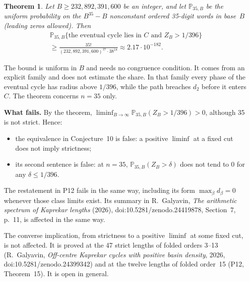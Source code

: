 \documentclass[11pt]{amsart}
\newtheorem*{theorem*}{Theorem}
\newcommand{\PP}{\mathbb{P}}
\begin{document}
\begin{theorem*}
Let \(B\ge 232{,}892{,}391{,}600\) be an integer, and let \(\PP_{35,B}\) be the uniform probability on the \(B^{35}-B\) nonconstant ordered 35-digit words in base~\(B\) (leading zeros allowed). Then
\begin{multline*}
\PP_{35,B}\{\text{the eventual cycle lies in }C\text{ and }Z_B>1/396\}\\
\ge\frac{35!}{(232{,}892{,}391{,}600)^{17}\cdot 38^{18}}\approx2.17\cdot10^{-182}.
\end{multline*}
\end{theorem*}

The bound is uniform in \(B\) and needs no congruence condition. It comes from an explicit family and does not estimate the share. In that family every phase of the eventual cycle has radius above \(1/396\), while the path breaches \(d_2\) before it enters \(C\). The theorem concerns \(n=35\) only.

\medskip\noindent\textbf{What fails.} By the theorem, \(\liminf_{B\to\infty}\PP_{35,B}(Z_B>1/396)>0\), although 35 is not strict. Hence:
\begin{itemize}
\item the equivalence in Conjecture~10 is false: a positive \(\liminf\) at a fixed cut does not imply strictness;
\item its second sentence is false: at \(n=35\), \(\PP_{35,B}(Z_B>\delta)\) does not tend to \(0\) for any \(\delta\le1/396\).
\end{itemize}
The restatement in P12 fails in the same way, including its form \(\max_\beta d_\beta=0\) whenever those class limits exist. Its summary in R.~Galyavin, \emph{The arithmetic spectrum of Kaprekar lengths} (2026), doi:10.5281/zenodo.24419878, Section~7, p.~11, is affected in the same way.

The converse implication, from strictness to a positive \(\liminf\) at some fixed cut, is not affected. It is proved at the 47 strict lengths of folded orders 3--13 (R.~Galyavin, \emph{Off-centre Kaprekar cycles with positive basin density}, 2026, doi:10.5281/zenodo.24399342) and at the twelve lengths of folded order~15 (P12, Theorem~15). It is open in general.
\end{document}
